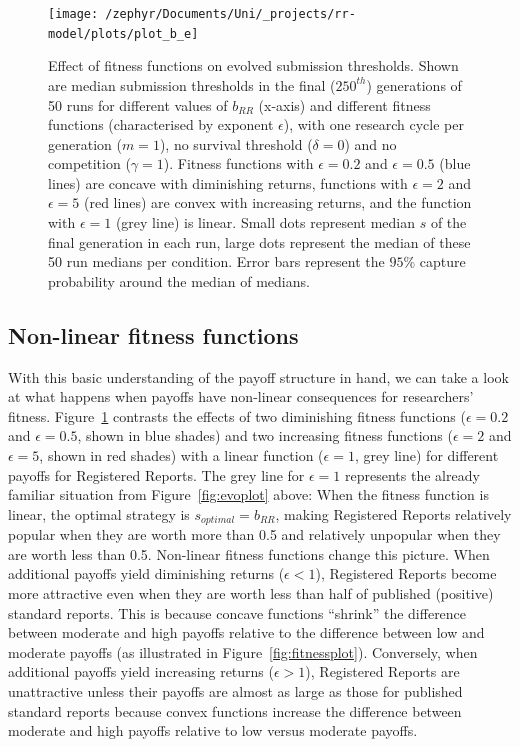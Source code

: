 \documentclass[british,,doc,mask,floatsintext]{apa6}
\begin{document}
\begin{figure}

{\centering \texttt{[image: /zephyr/Documents/Uni/\_projects/rr-model/plots/plot\_b\_e]} 

}

\caption{Effect of fitness functions on evolved submission thresholds. Shown are median submission thresholds in the final (\(250^{th}\)) generations of 50 runs for different values of \(b_{RR}\) (x-axis) and different fitness functions (characterised by exponent \(\epsilon\)), with one research cycle per generation (\(m = 1\)), no survival threshold (\(\delta = 0\)) and no competition (\(\gamma = 1\)). Fitness functions with \(\epsilon = 0.2\) and \(\epsilon = 0.5\) (blue lines) are concave with diminishing returns, functions with \(\epsilon = 2\) and \(\epsilon = 5\) (red lines) are convex with increasing returns, and the function with \(\epsilon = 1\) (grey line) is linear. Small dots represent median \(s\) of the final generation in each run, large dots represent the median of these 50 run medians per condition. Error bars represent the \(95\%\) capture probability around the median of medians.}\label{fig:epsilonplot}
\end{figure}

\hypertarget{non-linear-fitness-functions-1}{%
\subsection{Non-linear fitness functions}\label{non-linear-fitness-functions-1}}

With this basic understanding of the payoff structure in hand, we can take a look at what happens when payoffs have non-linear consequences for researchers' fitness.
Figure~\ref{fig:epsilonplot} contrasts the effects of two diminishing fitness functions (\(\epsilon = 0.2\) and \(\epsilon = 0.5\), shown in blue shades) and two increasing fitness functions (\(\epsilon = 2\) and \(\epsilon = 5\), shown in red shades) with a linear function (\(\epsilon = 1\), grey line) for different payoffs for Registered Reports.
The grey line for \(\epsilon = 1\) represents the already familiar situation from Figure~\ref{fig:evoplot} above:
When the fitness function is linear, the optimal strategy is \(s_{optimal} = b_{RR}\), making Registered Reports relatively popular when they are worth more than 0.5 and relatively unpopular when they are worth less than 0.5.
Non-linear fitness functions change this picture.
When additional payoffs yield diminishing returns (\(\epsilon <1\)), Registered Reports become more attractive even when they are worth less than half of published (positive) standard reports.
This is because concave functions \enquote{shrink} the difference between moderate and high payoffs relative to the difference between low and moderate payoffs (as illustrated in Figure~\ref{fig:fitnessplot}).
Conversely, when additional payoffs yield increasing returns (\(\epsilon > 1\)), Registered Reports are unattractive unless their payoffs are almost as large as those for published standard reports because convex functions increase the difference between moderate and high payoffs relative to low versus moderate payoffs.
\end{document}
